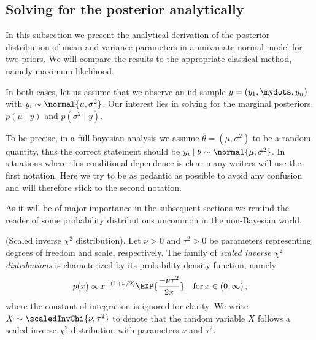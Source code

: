 \subsection{Solving for the posterior analytically}
In this subsection we present the analytical derivation of the posterior distribution of mean and variance parameters in a univariate normal model for two priors.
We will compare the results to the appropriate classical method, namely maximum likelihood.

In both cases, let us assume that we observe an iid sample $y = (y_1, \mydots, y_n)$
with $y_i \sim \normal{\mu, \sigma^2}$.
Our interest lies in solving for the marginal posteriors $p(\mu \mid y)$ and $p(\sigma^2 \mid y)$.

To be precise, in a full bayesian analysis we assume $\theta = (\mu, \sigma^2)$ to be a random quantity, thus the correct statement should be $y_i \mid \theta \sim \normal{\mu, \sigma^2}$.
In situations where this conditional dependence is clear many writers will use the first notation.
Here we try to be as pedantic as possible to avoid any confusion and will therefore stick to the second notation.

As it will be of major importance in the subsequent sections we remind the reader of some probability distributions uncommon in the non-Bayesian world.

\begin{definition}{(Scaled inverse $\chi^2$ distribution).}
  Let $\nu > 0$ and $\tau^2 > 0$ be parameters representing degrees of freedom and scale, respectively. The family of \emph{scaled inverse $\chi^2$ distributions} is characterized by its probability density function, namely
  \begin{align}
    p(x) \propto x^{-(1 + \nu / 2)} \EXP{\frac{-\nu \tau^2}{2 x}} \quad \text{for} \, x \in (0, \infty) \,,
  \end{align}
  where the constant of integration is ignored for clarity.
  We write $X \sim \scaledInvChi{\nu, \tau^2}$ to denote that the random variable $X$ follows a scaled inverse $\chi^2$ distribution with parameters $\nu$ and $\tau^2$.
\end{definition}

